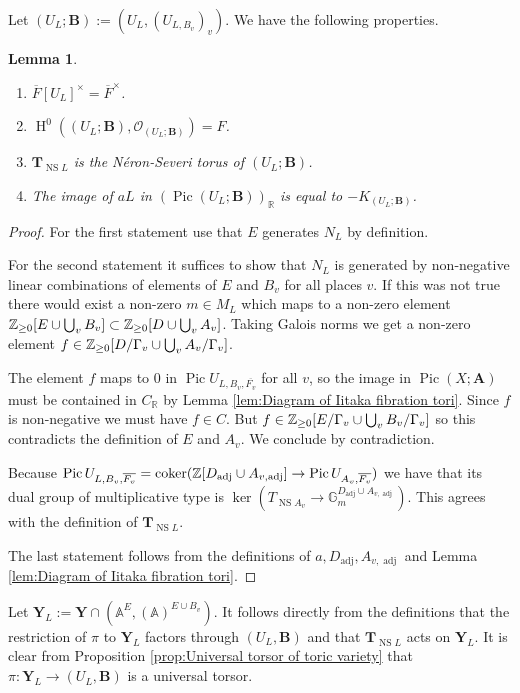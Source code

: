 \documentclass[a4paper,11pt,reqno]{amsart}
\newcommand{\R}{\mathbb{R}}
\newcommand{\G}{\mathbb{G}}
\newcommand{\A}{\mathbb{A}}
\DeclareMathOperator{\coker}{coker}
\DeclareMathOperator{\Pic}{Pic}
\DeclareMathOperator{\NS}{NS}
\DeclareMathOperator{\HH}{H}
\DeclareMathOperator{\adj}{adj}
\newtheorem{lemma}[theorem]{Lemma}
\theoremstyle{definition}
\begin{document}
Let $(U_L; \mathbf{B}) := (U_L, (U_{L, B_v})_v)$. We have the following properties.
\begin{lemma}\label{lem:Properties of U_L} \hfill
	\begin{enumerate}
		\item $\overline{F}[U_L]^{\times} = \overline{F}^{\times}$.
		\item $\HH^0((U_L; \mathbf{B}), \mathcal{O}_{(U_L; \mathbf{B})}) = F$.
		\item $\mathbf{T}_{\NS L}$ is the N\'eron-Severi torus of $(U_L; \mathbf{B})$.
		\item The image of $a L$ in $(\Pic (U_L; \mathbf{B}))_{\R}$ is equal to $- K_{(U_L; \mathbf{B})}$.
	\end{enumerate}
\end{lemma}
\begin{proof}
	For the first statement use that $E$ generates $N_L$ by definition.
	
	For the second statement it suffices to show that $N_L$ is generated by non-negative linear combinations of elements of $E$ and $B_v$ for all places $v$. If this was not true there would exist a non-zero $m \in M_L$ which maps to a non-zero element $\mathbb{Z}_{\geq 0}[E \cup \bigcup_v B_v] \subset \mathbb{Z}_{\geq 0}[D \cup \bigcup_v A_v]$. Taking Galois norms we get a non-zero element $f \in \mathbb{Z}_{\geq 0}[D / \Gamma_v \cup \bigcup_v A_v/ \Gamma_v]$. 
	
	The element $f$ maps to $0$ in $\Pic U_{L, B_v, \overline{F_v}}$ for all $v$, so the image in $\Pic(X; \mathbf{A})$ must be contained in $C_{\R}$ by Lemma \ref{lem:Diagram of Iitaka fibration tori}. Since $f$ is non-negative we must have $f \in C$. But $f \in \mathbb{Z}_{\geq 0}[E / \Gamma_v \cup \bigcup_v B_v/ \Gamma_v]$ so this contradicts the definition of $E$ and $A_v$. We conclude by contradiction.
	
	Because $\Pic U_{L, B_v, \overline{F_v}} = \coker(\Z[D_{\adj} \cup A_{v, \adj}] \to \Pic U_{A_v, \overline{F_v}})$ we have that its dual group of multiplicative type is $\ker(T_{\NS A_v} \to \G_m^{D_{\adj} \cup A_{v, \adj}})$. This agrees with the definition of $\mathbf{T}_{\NS L}$.
	
	The last statement follows from the definitions of $a, D_{\adj}, A_{v, \adj} $ and Lemma \ref{lem:Diagram of Iitaka fibration tori}.
\end{proof}

Let $\mathbf{Y}_L := \mathbf{Y} \cap (\A^{E}, (\A)^{E \cup B_v})$. It follows directly from the definitions that the restriction of $\pi$ to $\mathbf{Y}_L$ factors through $(U_L, \mathbf{B})$ and that $\mathbf{T}_{\NS L}$ acts on $\mathbf{Y}_{L}$. It is clear from Proposition \ref{prop:Universal torsor of toric variety} that $\pi: \mathbf{Y}_L \to (U_L, \mathbf{B})$ is a universal torsor.
\end{document}
